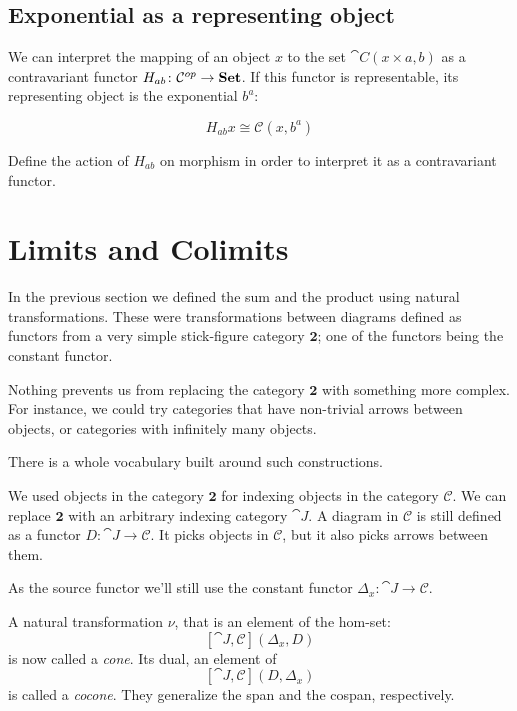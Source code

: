\documentclass[DaoFP]{subfiles}
\begin{document}
\subsection{Exponential as a representing object}

We can interpret the mapping of an object $x$ to the set $\cat C(x \times a, b)$ as a contravariant functor $H_{a b} \colon \mathcal{C}^{op} \to \mathbf{Set}$. If this functor is representable, its representing object is the exponential $b^a$:

\[ H_{a b} x \cong \mathcal{C}(x, b^a)\]

\begin{exercise}
Define the action of $H_{a b}$ on morphism in order to interpret it as a contravariant functor.
\end{exercise}

\section{Limits and Colimits}

In the previous section we defined the sum and the product using natural transformations. These were transformations between diagrams defined as functors from a very simple stick-figure category $\mathbf{2}$; one of the functors being the constant functor. 

Nothing prevents us from replacing the category $\mathbf{2}$ with something more complex. For instance, we could try categories that have non-trivial arrows between objects, or categories with infinitely many objects. 

There is a whole vocabulary built around such constructions. 

We used objects in the category $\mathbf{2}$ for indexing objects in the category $\mathcal{C}$. We can replace $\mathbf{2}$ with an arbitrary indexing category $\cat J$. A diagram in $\mathcal{C}$ is still defined as a functor $D \colon \cat J \to \mathcal{C}$. It picks objects in $\mathcal{C}$, but it also picks arrows between them.

As the source functor we'll still use the constant functor $\Delta_x \colon \cat J \to \mathcal{C}$.

A  natural transformation $\nu$, that is an element of the hom-set:
\[ [\cat J, \mathcal{C}](\Delta_x, D)  \]
is now called a \emph{cone}. Its dual, an element of
\[ [\cat J, \mathcal{C}](D, \Delta_x)  \]
is called a \emph{cocone}. They generalize the span and the cospan, respectively.
\end{document}
